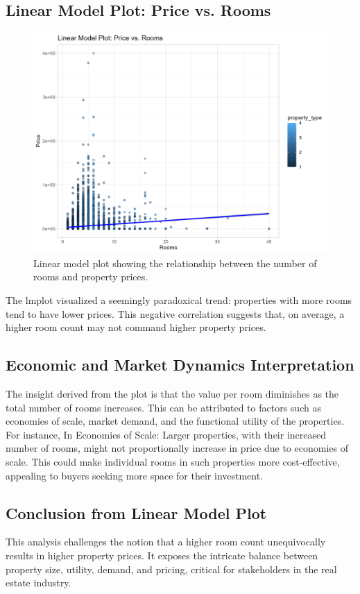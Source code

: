 \documentclass{article}
\begin{document}
\subsection{Linear Model Plot: Price vs. Rooms}
\begin{figure}[H]
\centering
\includegraphics[width=\textwidth]{PS6b_Olubayode.png}
\caption{Linear model plot showing the relationship between the number of rooms and property prices.}
\end{figure}

The lmplot visualized a seemingly paradoxical trend: properties with more rooms tend to have lower prices. This negative correlation suggests that, on average, a higher room count may not command higher property prices.

\subsection{Economic and Market Dynamics Interpretation}
The insight derived from the plot is that the value per room diminishes as the total number of rooms increases. This can be attributed to factors such as economies of scale, market demand, and the functional utility of the properties. For instance, In Economies of Scale: Larger properties, with their increased number of rooms, might not proportionally increase in price due to economies of scale. This could make individual rooms in such properties more cost-effective, appealing to buyers seeking more space for their investment.

\subsection{Conclusion from Linear Model Plot}
This analysis challenges the notion that a higher room count unequivocally results in higher property prices. It exposes the intricate balance between property size, utility, demand, and pricing, critical for stakeholders in the real estate industry.
\end{document}
